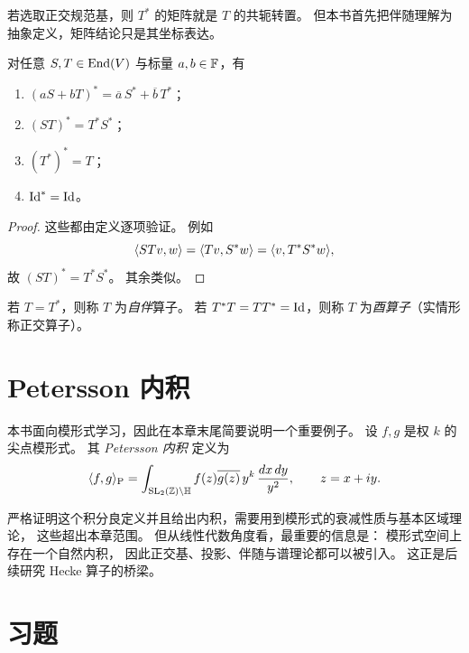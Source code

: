 \begin{remark}
若选取正交规范基，则 $T^*$ 的矩阵就是 $T$ 的共轭转置。
但本书首先把伴随理解为抽象定义，矩阵结论只是其坐标表达。
\end{remark}

\begin{proposition}
对任意 $S,T\in\mathrm{End}(V)$ 与标量 $a,b\in\mathbb{F}$，有
\begin{enumerate}[label=(\alph*)]
\item $(aS+bT)^*=\overline a\,S^*+\overline b\,T^*$；
\item $(ST)^*=T^*S^*$；
\item $(T^*)^*=T$；
\item $\mathrm{Id}^*=\mathrm{Id}$。
\end{enumerate}
\end{proposition}

\begin{proof}
这些都由定义逐项验证。
例如
\[
\langle STv, w \rangle=\langle Tv, S^*w \rangle=\langle v, T^*S^*w \rangle,
\]
故 $(ST)^*=T^*S^*$。
其余类似。
\end{proof}

\begin{definition}
若 $T=T^*$，则称 $T$ 为\emph{自伴}算子。
若 $T^*T=TT^*=\mathrm{Id}$，则称 $T$ 为\emph{酉算子}（实情形称正交算子）。
\end{definition}

\section{Petersson 内积}

本书面向模形式学习，因此在本章末尾简要说明一个重要例子。
设 $f,g$ 是权 $k$ 的尖点模形式。
其 \emph{Petersson 内积} 定义为
\[
\langle f, g \rangle_{\mathrm P}
=
\int_{\mathrm{SL}_2(\mathbb{Z})\backslash \mathbb H}
 f(z)\overline{g(z)}\, y^k\,\frac{dx\,dy}{y^2},
\qquad z=x+iy.
\]

严格证明这个积分良定义并且给出内积，需要用到模形式的衰减性质与基本区域理论，
这些超出本章范围。
但从线性代数角度看，最重要的信息是：
模形式空间上存在一个自然内积，
因此正交基、投影、伴随与谱理论都可以被引入。
这正是后续研究 Hecke 算子的桥梁。

\section*{习题}

